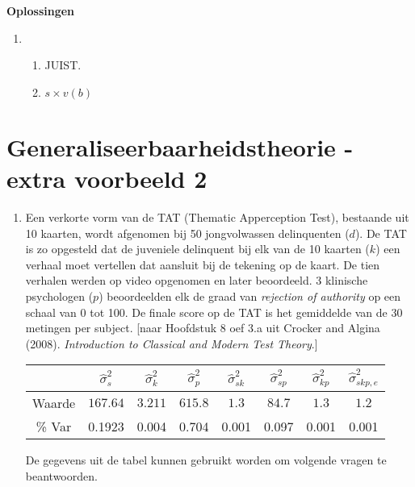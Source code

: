 \OPLOSSING
{
\textbf{Oplossingen}
\begin{enumerate}

\item
\begin{enumerate}
\item JUIST.
\item $s \times v(b)$

\end{enumerate}


\end{enumerate}
}


\OPGAVE
{
\section{Generaliseerbaarheidstheorie - extra voorbeeld 2}

\begin{enumerate}

\item
Een verkorte vorm van de TAT (Thematic Apperception Test), bestaande uit 10 kaarten, wordt afgenomen bij 50
jongvolwassen delinquenten ($d$).
De TAT is zo opgesteld dat de juveniele delinquent bij elk van de 10 kaarten ($k$) een verhaal moet vertellen dat aansluit bij de tekening op de kaart.
De tien verhalen werden op video opgenomen en later beoordeeld.
3 klinische psychologen ($p$) beoordeelden elk de graad van \emph{rejection of authority} op een schaal van 0 tot 100.
De finale score op de TAT is het gemiddelde van de 30 metingen per subject.
[naar Hoofdstuk 8 oef 3.a uit Crocker and Algina (2008). \emph{Introduction to Classical and Modern Test Theory}.]

\begin{center}
\renewcommand{\arraystretch}{1.2}
\begin{tabular}{|c|c|c|c|c|c|c|c|} \hline
 & $ \hat{\sigma}^2_{s} $ & $ \hat{\sigma}^2_{k} $& $ \hat{\sigma}^2_{p} $ & $ \hat{\sigma}^2_{sk} $ & $ \hat{\sigma}^2_{sp} $ & $ \hat{\sigma}^2_{kp} $ & $ \hat{\sigma}^2_{skp,e} $ \\ \hline
Waarde  & $ 167.64 $ & $ 3.211 $ & $615.8 $ & $ 1.3 $ & $ 84.7 $ & $ 1.3 $ & $ 1.2 $ \\
\% Var & 0.1923& 0.004& 0.704& 0.001& 0.097& 0.001& 0.001 \\ \hline
\end{tabular}
\end{center}

\normalsize
De gegevens uit de tabel kunnen gebruikt worden om volgende vragen te beantwoorden.


\end{enumerate}}
